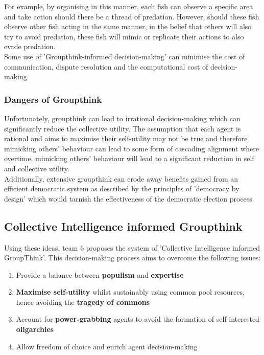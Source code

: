 For example, by organising in this manner, each fish can observe a specific area and take action should there be a thread of predation. However, should these fish observe other fish acting in the same manner, in the belief that others will also try to avoid predation, these fish will mimic or replicate their actions to also evade predation. \\

Some use of 'Groupthink-informed decision-making' can minimise the cost of communication, dispute resolution and the computational cost of decision-making. 

\subsubsection{Dangers of Groupthink}

Unfortunately, groupthink can lead to irrational decision-making which can significantly reduce the collective utility. The assumption that each agent is rational and aims to maximise their self-utility may not be true and therefore mimicking others' behaviour can lead to some form of cascading alignment where overtime, mimicking others' behaviour will lead to a significant reduction in self and collective utility. \\

Additionally, extensive groupthink can erode away benefits gained from an efficient democratic system as described by the principles of 'democracy by design' which would tarnish the effectiveness of the democratic election process.

\subsection{Collective Intelligence informed Groupthink}

Using these ideas, team 6 proposes the system of 'Collective Intelligence informed GroupThink'.  This decision-making process aims to overcome the following issues:

\begin{enumerate}
  \item Provide a balance between \textbf{populism} and \textbf{expertise}
  \item\textbf{Maximise self-utility} whilst sustainably using common pool resources, hence avoiding the \textbf{tragedy of commons}
  \item Account for \textbf{power-grabbing} agents to avoid the formation of self-interested \textbf{oligarchies}
  \item Allow freedom of choice and enrich agent decision-making
\end{enumerate}

